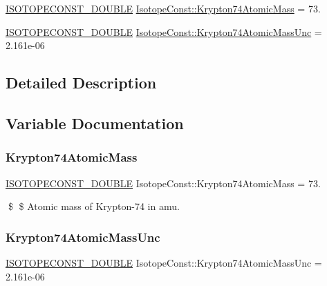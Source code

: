 \begin{DoxyCompactItemize}
\item 
\mbox{\hyperlink{group___isotope_const-_macros_ga8f45a7272ce02c0b4c65c44636ed719a}{I\+S\+O\+T\+O\+P\+E\+C\+O\+N\+S\+T\+\_\+\+D\+O\+U\+B\+LE}} \mbox{\hyperlink{group___isotope_const-_krypton-_kr74_ga43b04b109aeca5edf65b5bfa11ad3801}{Isotope\+Const\+::\+Krypton74\+Atomic\+Mass}} = 73.
\item 
\mbox{\hyperlink{group___isotope_const-_macros_ga8f45a7272ce02c0b4c65c44636ed719a}{I\+S\+O\+T\+O\+P\+E\+C\+O\+N\+S\+T\+\_\+\+D\+O\+U\+B\+LE}} \mbox{\hyperlink{group___isotope_const-_krypton-_kr74_ga102604048a47b0d107837702bac8a66d}{Isotope\+Const\+::\+Krypton74\+Atomic\+Mass\+Unc}} = 2.\+161e-\/06
\end{DoxyCompactItemize}


\subsection{Detailed Description}


\subsection{Variable Documentation}
\mbox{\label{group___isotope_const-_krypton-_kr74_ga43b04b109aeca5edf65b5bfa11ad3801}} 
\subsubsection{\texorpdfstring{Krypton74\+Atomic\+Mass}{Krypton74AtomicMass}}
{\footnotesize\ttfamily \mbox{\hyperlink{group___isotope_const-_macros_ga8f45a7272ce02c0b4c65c44636ed719a}{I\+S\+O\+T\+O\+P\+E\+C\+O\+N\+S\+T\+\_\+\+D\+O\+U\+B\+LE}} Isotope\+Const\+::\+Krypton74\+Atomic\+Mass = 73.}

\$ \$ Atomic mass of Krypton-\/74 in amu. \mbox{\label{group___isotope_const-_krypton-_kr74_ga102604048a47b0d107837702bac8a66d}} 
\subsubsection{\texorpdfstring{Krypton74\+Atomic\+Mass\+Unc}{Krypton74AtomicMassUnc}}
{\footnotesize\ttfamily \mbox{\hyperlink{group___isotope_const-_macros_ga8f45a7272ce02c0b4c65c44636ed719a}{I\+S\+O\+T\+O\+P\+E\+C\+O\+N\+S\+T\+\_\+\+D\+O\+U\+B\+LE}} Isotope\+Const\+::\+Krypton74\+Atomic\+Mass\+Unc = 2.\+161e-\/06}

